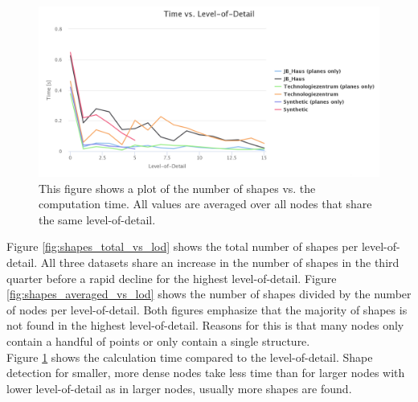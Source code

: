 \begin{figure}[h]
    \centering
    \includegraphics[width=1\textwidth]{Results/time_vs_lod.png}
    \caption[Plot of the number of shapes vs. the computation time]
		{This figure shows a plot of the number of shapes vs. the computation time. All values are averaged over all nodes that share the same level-of-detail.}
    \label{fig:time_vs_lod}
\end{figure}


Figure \ref{fig:shapes_total_vs_lod} shows the total number of shapes per level-of-detail. All three datasets share an increase in the number of shapes in the third quarter before a rapid decline for the highest level-of-detail. Figure \ref{fig:shapes_averaged_vs_lod} shows the number of shapes divided by the number of nodes per level-of-detail. Both figures emphasize that the majority of shapes is not found in the highest level-of-detail. Reasons for this is that many nodes only contain a handful of points or only contain a single structure. 
\\

Figure \ref{fig:time_vs_lod} shows the calculation time compared to the level-of-detail. Shape detection for smaller, more dense nodes take less time than for larger nodes with lower level-of-detail as in larger nodes, usually more shapes are found. 



